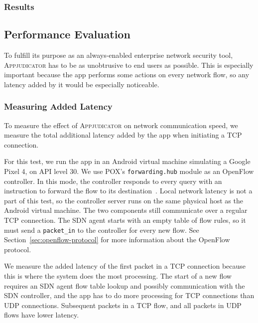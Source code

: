 \subsubsection{Results}
\label{sec:practical-results}


\subsection{Performance Evaluation}
\label{sec:performance-evaluation}

To fulfill its purpose as an always-enabled enterprise network security tool,
\textsc{Appjudicator} has to be as unobtrusive to end users as possible. This is
especially important because the app performs some actions on every network
flow, so any latency added by it would be especially noticeable.

\subsubsection{Measuring Added Latency}
\label{sec:measuring-added-latency}

To measure the effect of \textsc{Appjudicator} on network communication speed,
we measure the total additional latency added by the app when initiating a TCP
connection.

For this test, we run the app in an Android virtual machine simulating a Google
Pixel 4, on API level 30. We use POX's \texttt{forwarding.hub} module as an
OpenFlow controller. In this mode, the controller responds to every query with
an instruction to forward the flow to its destination~\cite{mccauley2015}. Local
network latency is not a part of this test, so the controller server runs on the
same physical host as the Android virtual machine. The two components still
communicate over a regular TCP connection. The SDN agent starts with an empty
table of flow rules, so it must send a \texttt{packet\_in} to the controller for
every new flow. See Section~\ref{sec:openflow-protocol} for more information
about the OpenFlow protocol.

We measure the added latency of the first packet in a TCP connection because
this is where the system does the most processing. The start of a new flow
requires an SDN agent flow table lookup and possibly communication with the SDN
controller, and the app has to do more processing for TCP connections than UDP
connections. Subsequent packets in a TCP flow, and all packets in UDP flows
have lower latency.


